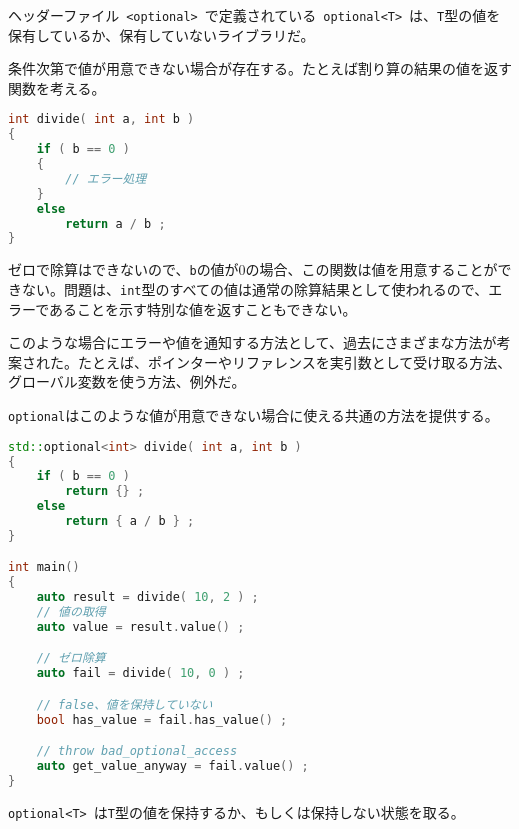 %

%

ヘッダーファイル~\lstinline!<optional>!~で定義されている~\lstinline!optional<T>!~は、\lstinline!T!型の値を保有しているか、保有していないライブラリだ。

条件次第で値が用意できない場合が存在する。たとえば割り算の結果の値を返す関数を考える。

\begin{lstlisting}[language=C++]
int divide( int a, int b )
{
    if ( b == 0 )
    {
        // エラー処理
    }
    else
        return a / b ;
}
\end{lstlisting}

ゼロで除算はできないので、\lstinline!b!の値が0の場合、この関数は値を用意することができない。問題は、\lstinline!int!型のすべての値は通常の除算結果として使われるので、エラーであることを示す特別な値を返すこともできない。

このような場合にエラーや値を通知する方法として、過去にさまざまな方法が考案された。たとえば、ポインターやリファレンスを実引数として受け取る方法、グローバル変数を使う方法、例外だ。

\lstinline!optional!はこのような値が用意できない場合に使える共通の方法を提供する。

\begin{lstlisting}[language=C++]
std::optional<int> divide( int a, int b )
{
    if ( b == 0 )
        return {} ;
    else
        return { a / b } ;
}

int main()
{
    auto result = divide( 10, 2 ) ;
    // 値の取得
    auto value = result.value() ;

    // ゼロ除算
    auto fail = divide( 10, 0 ) ;

    // false、値を保持していない
    bool has_value = fail.has_value() ;

    // throw bad_optional_access
    auto get_value_anyway = fail.value() ;
}
\end{lstlisting}

%

\lstinline!optional<T>!~は\lstinline!T!型の値を保持するか、もしくは保持しない状態を取る。

